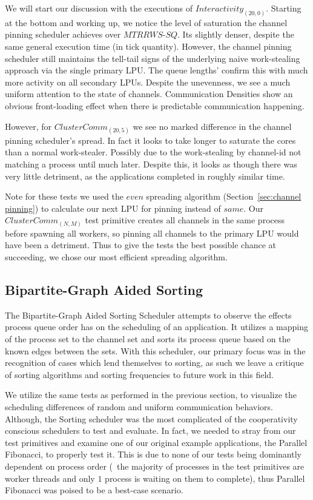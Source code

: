 We will start our discussion with the executions of $Interactivity_{(20,0)}$.
Starting at the bottom and working up, we notice the level of saturation the 
channel pinning scheduler achieves over $MTRRWS$-$SQ$. Its slightly denser,
despite the same general execution time (in tick quantity). However, the channel
pinning scheduler still maintains the tell-tail signs of the underlying 
naive work-stealing approach via the single primary LPU. The queue lengths'
confirm this with much more activity on all secondary LPUs. Despite the 
unevenness, we see a much uniform attention to the state of channels.
Communication Densities show an obvious front-loading effect when there is 
predictable communication happening. 

However, for $ClusterComm_{(20,5)}$ we see no marked difference in the channel
pinning scheduler's spread. In fact it looks to take longer to saturate the 
cores than a normal work-stealer. Possibly due to the work-stealing by channel-id
not matching a process until much later. Despite this, it looks as though there 
was very little detriment, as the applications completed in roughly similar time.

Note for these tests we used the $even$ spreading algorithm 
(Section~\ref{sec:channel pinning}) to calculate our next LPU for pinning instead of
$same$. Our $ClusterComm_{(N,M)}$ test primitive creates all channels in the same
process before spawning all workers, so pinning all channels to the primary LPU 
would have been a detriment. Thus to give the tests the best possible chance
at succeeding, we chose our most efficient spreading algorithm.

\subsection{Bipartite-Graph Aided Sorting}\label{sec:results-smartsort}

The Bipartite-Graph Aided Sorting Scheduler attempts to observe the effects
process queue order has on the scheduling of an application. It utilizes a mapping
of the process set to the channel set and sorts its process queue based on 
the known edges between the sets. With this scheduler, our primary focus was
in the recognition of cases which lend themselves to sorting, as such we 
leave a critique of sorting algorithms and sorting frequencies to future work
in this field.

We utilize the same tests as performed in the previous section, to visualize the
scheduling differences of random and uniform communication behaviors. 
Although, the Sorting scheduler was the most complicated of the cooperativity 
conscious schedulers to test and evaluate. In fact, we needed to stray from our 
test primitives and examine one of our original example applications, the 
Parallel Fibonacci, to properly test it. This is due to none of our tests
being dominantly dependent on process order (\ie~the majority of processes in the
test primitives are worker threads and only $1$ process is waiting on them to
complete), thus Parallel Fibonacci was poised to be a best-case scenario.


